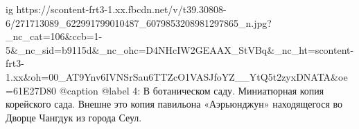  
 
 
 
 

\ifcmt
  ig https://scontent-frt3-1.xx.fbcdn.net/v/t39.30808-6/271713089_622991799010487_6079853208981297865_n.jpg?_nc_cat=106&ccb=1-5&_nc_sid=b9115d&_nc_ohc=D4NHcIW2GEAAX_StVBq&_nc_ht=scontent-frt3-1.xx&oh=00_AT9Ynv6IVNSrSau6TTZcO1VASJfoYZ__YtQ5t2zyxDNATA&oe=61E27D80
  @caption @label 4: В ботаническом саду. Миниатюрная копия корейского сада. Внешне это копия павильона «Аэрьюнджун» находящегося во Дворце Чангдук из города Сеул.
\fi
